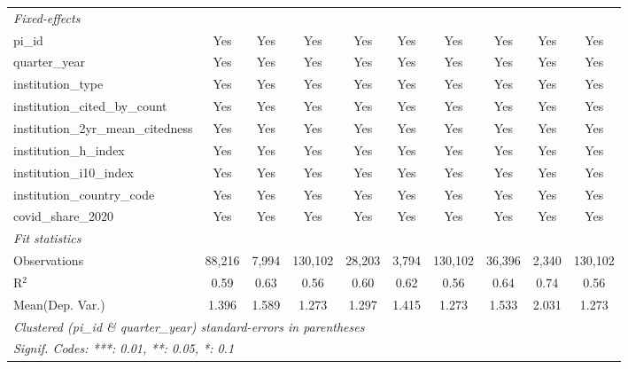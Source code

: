 \begin{tabular}{lccccccccc}
   \midrule
   \emph{Fixed-effects}\\
   pi\_id                                                      & Yes           & Yes           & Yes           & Yes            & Yes            & Yes           & Yes           & Yes           & Yes\\  
   quarter\_year                                               & Yes           & Yes           & Yes           & Yes            & Yes            & Yes           & Yes           & Yes           & Yes\\  
   institution\_type                                           & Yes           & Yes           & Yes           & Yes            & Yes            & Yes           & Yes           & Yes           & Yes\\  
   institution\_cited\_by\_count                               & Yes           & Yes           & Yes           & Yes            & Yes            & Yes           & Yes           & Yes           & Yes\\  
   institution\_2yr\_mean\_citedness                           & Yes           & Yes           & Yes           & Yes            & Yes            & Yes           & Yes           & Yes           & Yes\\  
   institution\_h\_index                                       & Yes           & Yes           & Yes           & Yes            & Yes            & Yes           & Yes           & Yes           & Yes\\  
   institution\_i10\_index                                     & Yes           & Yes           & Yes           & Yes            & Yes            & Yes           & Yes           & Yes           & Yes\\  
   institution\_country\_code                                  & Yes           & Yes           & Yes           & Yes            & Yes            & Yes           & Yes           & Yes           & Yes\\  
   covid\_share\_2020                                          & Yes           & Yes           & Yes           & Yes            & Yes            & Yes           & Yes           & Yes           & Yes\\  
   \midrule
   \emph{Fit statistics}\\
   Observations                                                & 88,216        & 7,994         & 130,102       & 28,203         & 3,794          & 130,102       & 36,396        & 2,340         & 130,102\\  
   R$^2$                                                       & 0.59          & 0.63          & 0.56          & 0.60           & 0.62           & 0.56          & 0.64          & 0.74          & 0.56\\  
Mean(Dep. Var.) & 1.396 & 1.589 & 1.273 & 1.297 & 1.415 & 1.273 & 1.533 & 2.031 & 1.273 \\
   \midrule \midrule
   \multicolumn{10}{l}{\emph{Clustered (pi\_id \& quarter\_year) standard-errors in parentheses}}\\
   \multicolumn{10}{l}{\emph{Signif. Codes: ***: 0.01, **: 0.05, *: 0.1}}\\
\end{tabular}
\par\endgroup
